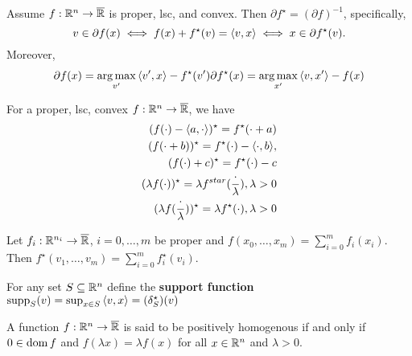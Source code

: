 \begin{thm}
  \label{sec:conjugate-functions-9}
  Assume $f: \mathbb{R}^{n} \rightarrow \overline {\mathbb{R}}$ is proper, lsc, and
  convex.  Then $\partial f^{\star} = (\partial f)^{-1}$,
  specifically,
  \begin{equation}
    \label{eq:20}
    v \in \partial f(x) \iff f(x) + f^{\star}(v) = \IP{v, x} \iff x
    \in \partial f^{\star}(v).
  \end{equation}
  Moreover,
  \begin{align}
    \label{eq:22}
    \partial f(x) = \argmax_{v'} \IP{v', x} - f^{\star}(v')
    \partial f^{\star}(x) = \argmax_{x'} \IP{v, x'} - f(x)
  \end{align}
\end{thm}

\begin{thm}
  \label{sec:conjugate-functions-10}
  For a proper, lsc, convex $f: \mathbb{R}^{n} \rightarrow \overline {\mathbb{R}}$, we
  have
  \begin{align}
    \label{eq:23}
    (f(\cdot) - \IP{a, \cdot})^{\star} = f^{\star}(\cdot + a) \\
    \label{eq:24}
    (f(\cdot + b))^{\star} = f^{\star}(\cdot) - \IP{\cdot, b}, \\
    \label{eq:25}
    (f(\cdot) + c)^{\star} = f^{\star}(\cdot) - c \\
    \label{eq:26}
    (\lambda f(\cdot))^{\star} = \lambda
    f^{star}(\frac{\cdot}{\lambda}), \lambda > 0 \\
    \label{eq:27}
    (\lambda f(\frac{\cdot}{\lambda} ))^{\star} = \lambda
    f^{\star}(\cdot), \lambda > 0
  \end{align}
\end{thm}

\begin{thm}
  \label{sec:conjugate-functions-11}
  Let $f_{i}: \mathbb{R}^{n_{i}} \rightarrow \overline {\mathbb{R}}$, $i = 0, \dots, m$
  be proper and $f(x_{0}, \dots, x_{m}) = \sum_{i=0}^{m}
  f_{i}(x_{i})$.  Then $f^{\star}(v_{1}, \dots, v_{m}) = \sum_{i=0}^{m} f^{\star}_{i}(v_{i})$.
\end{thm}

\begin{defn}
  \label{sec:conjugate-functions-12}
  For any set $S \subseteq \mathbb{R}^{n}$ define the \textbf{support
    function} $\supp_{S}(v) = \sup_{x \in S} \IP{v, x} = (\delta^{\star}_{S})(v)$
\end{defn}

\begin{defn}
  \label{sec:conjugate-functions-13}
  A function $f: \mathbb{R}^{n} \rightarrow \overline {\mathbb{R}}$ is said to be
  positively homogenous if and only if $0 \in \operatorname*{dom} f$ and $f(\lambda
  x) = \lambda f(x)$ for all $x \in \mathbb{R}^{n}$ and $\lambda > 0$.
\end{defn}


